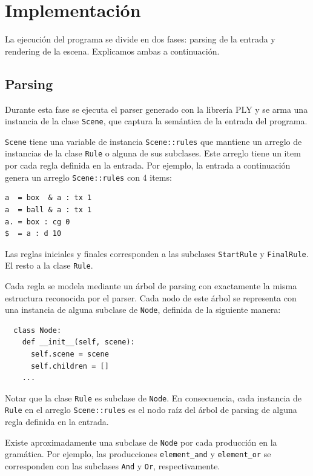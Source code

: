 \documentclass[a4paper, 10pt, twoside]{article}
\begin{document}
\section{Implementación}

La ejecución del programa se divide en dos fases: parsing de la entrada y rendering de la escena. Explicamos ambas a continuación.


\subsection{Parsing}

Durante esta fase se ejecuta el parser generado con la librería PLY y se arma una instancia de la clase \texttt{Scene}, que captura la semántica de la entrada del programa.

\texttt{Scene} tiene una variable de instancia \texttt{Scene::rules} que mantiene un arreglo de instancias de la clase \texttt{Rule} o alguna de sus subclases. Este arreglo tiene un item por cada regla definida en la entrada. Por ejemplo, la entrada a continuación genera un arreglo \texttt{Scene::rules} con 4 items:

\begin{verbatim}
a  = box  & a : tx 1
a  = ball & a : tx 1
a. = box : cg 0
$  = a : d 10
\end{verbatim}

Las reglas iniciales y finales corresponden a las subclases \texttt{StartRule} y \texttt{FinalRule}. El resto a la clase \texttt{Rule}.

Cada regla se modela mediante un árbol de parsing con exactamente la misma estructura reconocida por el parser. Cada nodo de este árbol se representa con una instancia de alguna subclase de \texttt{Node}, definida de la siguiente manera:

\begin{verbatim}
  class Node:
    def __init__(self, scene):
      self.scene = scene
      self.children = []
    ...
\end{verbatim}

Notar que la clase \texttt{Rule} es subclase de \texttt{Node}. En consecuencia, cada instancia de \texttt{Rule} en el arreglo \texttt{Scene::rules} es el nodo raíz del árbol de parsing de alguna regla definida en la entrada.

Existe aproximadamente una subclase de \texttt{Node} por cada producción en la gramática. Por ejemplo, las producciones \texttt{element\_and} y \texttt{element\_or} se corresponden con las subclases \texttt{And} y \texttt{Or}, respectivamente.
\end{document}
